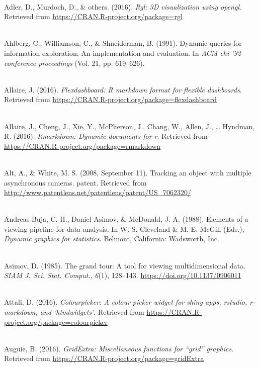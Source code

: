 \documentclass[12pt,]{isuthesis}
\begin{document}

\let\oldhypertarget\hypertarget
\renewcommand{\hypertarget}[2]{\oldhypertarget{#1}{#2}~\\}

\hypertarget{ref-rgl}{}
Adler, D., Murdoch, D., \& others. (2016). \emph{Rgl: 3D visualization
using opengl}. Retrieved from
\url{https://CRAN.R-project.org/package=rgl}

\hypertarget{ref-Ahlberg:1991}{}
Ahlberg, C., Williamson, C., \& Shneiderman, B. (1991). Dynamic queries
for information exploration: An implementation and evaluation. In
\emph{ACM chi '92 conference proceedings} (Vol. 21, pp. 619--626).

\hypertarget{ref-flexdashboard}{}
Allaire, J. (2016). \emph{Flexdashboard: R markdown format for flexible
dashboards}. Retrieved from
\url{https://CRAN.R-project.org/package=flexdashboard}

\hypertarget{ref-rmarkdown}{}
Allaire, J., Cheng, J., Xie, Y., McPherson, J., Chang, W., Allen, J.,
\ldots{} Hyndman, R. (2016). \emph{Rmarkdown: Dynamic documents for r}.
Retrieved from \url{https://CRAN.R-project.org/package=rmarkdown}

\hypertarget{ref-patent}{}
Alt, A., \& White, M. S. (2008, September 11). Tracking an object with
multiple asynchronous cameras. patent. Retrieved from
\url{http://www.patentlens.net/patentlens/patent/US_7062320/}

\hypertarget{ref-viewing-pipeline}{}
Andreas Buja, C. H., Daniel Asimov, \& McDonald, J. A. (1988). Elements
of a viewing pipeline for data analysis. In W. S. Cleveland \& M. E.
McGill (Eds.), \emph{Dynamic graphics for statistics}. Belmont,
California: Wadsworth, Inc.

\hypertarget{ref-grand-tour}{}
Asimov, D. (1985). The grand tour: A tool for viewing multidimensional
data. \emph{SIAM J. Sci. Stat. Comput.}, \emph{6}(1), 128--143.
\url{https://doi.org/10.1137/0906011}

\hypertarget{ref-colourpicker}{}
Attali, D. (2016). \emph{Colourpicker: A colour picker widget for shiny
apps, rstudio, r-markdown, and 'htmlwidgets'}. Retrieved from
\url{https://CRAN.R-project.org/package=colourpicker}

\hypertarget{ref-gridExtra}{}
Auguie, B. (2016). \emph{GridExtra: Miscellaneous functions for ``grid'' graphics}. Retrieved from \url{https://CRAN.R-project.org/package=gridExtra}
\end{document}
